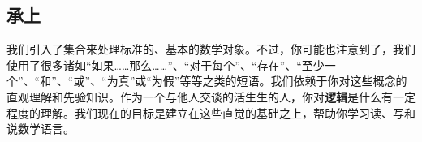 \subsection{承上}

我们引入了集合来处理标准的、基本的数学对象。不过，你可能也注意到了，我们使用了很多诸如``如果……那么……''、``对于每个''、``存在''、``至少一个''、``和''、``或''、``为真''或``为假''等等之类的短语。我们依赖于你对这些概念的直观理解和先验知识。作为一个与他人交谈的活生生的人，你对\textbf{逻辑}是什么有一定程度的理解。我们现在的目标是建立在这些直觉的基础之上，帮助你学习读、写和说数学语言。
